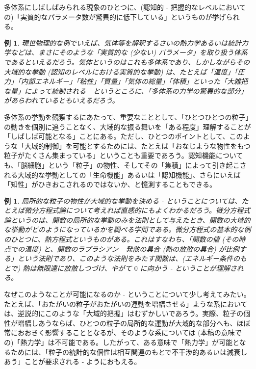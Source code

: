 \documentclass{jsarticle}
\theoremstyle{break}
\newtheorem{ex}[thm]{例}
\begin{document}
多体系にしばしばみられる現象のひとつに、(認知的 - 把握的なレベルにおいての)「実質的なパラメータ数が驚異的に低下している」というものが挙げられる。

\begin{ex}
現世物理的な例でいえば、気体等を解釈するさいの熱力学あるいは統計力学などは、まさにそのような「実質的な (少ない) パラメータ」を取り扱う体系であるといえるだろう。気体というのはこれも多体系であり、しかしながらその大域的な挙動 (認知のレベルにおける実質的な挙動) は、たとえば「温度」「圧力」「内部エネルギー」「粘性」「質量」「気体の総量」「体積」といった「大雑把な量」によって統制される - というところに、「多体系の力学の驚異的な部分」があらわれているともいえるだろう。
\end{ex}

多体系の挙動を観察するにあたって、重要なこととして、「ひとつひとつの粒子」の動きを個別に追うことなく、大域的な振る舞いを「ある程度」理解することが「しばしば可能となる」ことにある。ただし、ひとつのポイントとして、このような「大域的制御」を可能とするためには、たとえば「おなじような物性をもつ粒子がたくさん集まっている」ということも重要であろう。認知機能についても、「脳細胞」という「粒子」の物性、そしてその「集積」によって引き起こされる大域的な挙動としての「生命機能」あるいは「認知機能」、さらにいえば「知性」がひきおこされるのではないか、と憶測することもできる。

\begin{ex}
局所的な粒子の物性が大域的な挙動を決める - ということについては、たとえば微分方程式論について考えれば直感的にもよくわかるだろう。微分方程式論というのは、関数の局所的な挙動のみを法則として与えたとき、関数の大域的な挙動がどのようになっているかを調べる学問である。微分方程式の基本的な例のひとつに、熱方程式というものがある。これはすなわち、「関数の値 (その時点での温度) と、関数のラプラシアン - 発散の具合 (熱の放散の具合) が比例する」という法則であり、このような法則をみたす関数は、(エネルギー条件のもとで) 熱は無限遠に放散しつづけ、やがて $0$ に向かう - ということが理解される。
\end{ex}

なぜこのようなことが可能になるのか - ということについて少し考えてみたい。たとえば、「おたがいの粒子がおたがいの運動を増幅させる」ような系においては、逆説的にこのような「大域的把握」はむずかしいであろう。実際、粒子の個性が増幅しあうならば、ひとつの粒子の局所的な運動が大域的な部分へも、ほぼ常におおきく影響することとなるが、そのような系については (本稿の意味での)「熱力学」は不可能である。したがって、ある意味で「熱力学」が可能となるためには、「粒子の統計的な個性は相互関連のもとで不干渉的あるいは減衰しあう」ことが要求される - ようにおもえる。
\end{document}
